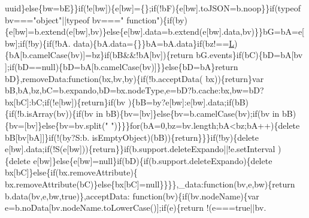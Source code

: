 \begin{DoxyCode}
      uuid\}\textcolor{keywordflow}{else}\{bw=bE\}\}\textcolor{keywordflow}{if}(!e[bw])\{e[bw]=\{\};\textcolor{keywordflow}{if}(!bF)\{e[bw].toJSON=b.noop\}\}\textcolor{keywordflow}{if}(typeof bv===\textcolor{stringliteral}{"object"}||typeof bv===\textcolor{stringliteral}{"
      function"})\{\textcolor{keywordflow}{if}(by)\{e[bw]=b.extend(e[bw],bv)\}\textcolor{keywordflow}{else}\{e[bw].data=b.extend(e[bw].data,bv)\}\}bG=bA=e[bw];\textcolor{keywordflow}{if}(!by)\{\textcolor{keywordflow}{if}(!bA.
      data)\{bA.data=\{\}\}bA=bA.data\}\textcolor{keywordflow}{if}(bz!==\hyperlink{jquery_8js_a38ee4c0b5f4fe2a18d0c783af540d253}{L})\{bA[b.camelCase(bv)]=bz\}\textcolor{keywordflow}{if}(bB&&!bA[bv])\{\textcolor{keywordflow}{return} bG.events\}\textcolor{keywordflow}{if}(bC)\{bD=bA[bv
      ];\textcolor{keywordflow}{if}(bD==null)\{bD=bA[b.camelCase(bv)]\}\}\textcolor{keywordflow}{else}\{bD=bA\}\textcolor{keywordflow}{return} bD\},removeData:\textcolor{keyword}{function}(bx,bv,by)\{\textcolor{keywordflow}{if}(!b.acceptData(
      bx))\{\textcolor{keywordflow}{return}\}var bB,bA,bz,bC=b.expando,bD=bx.nodeType,e=bD?b.cache:bx,bw=bD?bx[bC]:bC;\textcolor{keywordflow}{if}(!e[bw])\{\textcolor{keywordflow}{return}\}\textcolor{keywordflow}{if}(bv
      )\{bB=by?e[bw]:e[bw].data;\textcolor{keywordflow}{if}(bB)\{\textcolor{keywordflow}{if}(!b.isArray(bv))\{\textcolor{keywordflow}{if}(bv in bB)\{bv=[bv]\}\textcolor{keywordflow}{else}\{bv=b.camelCase(bv);\textcolor{keywordflow}{if}(bv in bB)
      \{bv=[bv]\}\textcolor{keywordflow}{else}\{bv=bv.split(\textcolor{stringliteral}{" "})\}\}\}\textcolor{keywordflow}{for}(bA=0,bz=bv.length;bA<bz;bA++)\{\textcolor{keyword}{delete} bB[bv[bA]]\}\textcolor{keywordflow}{if}(!(by?S:b.
      isEmptyObject)(bB))\{\textcolor{keywordflow}{return}\}\}\}\textcolor{keywordflow}{if}(!by)\{\textcolor{keyword}{delete} e[bw].data;\textcolor{keywordflow}{if}(!S(e[bw]))\{\textcolor{keywordflow}{return}\}\}\textcolor{keywordflow}{if}(b.support.deleteExpando||!e.setInterval
      )\{\textcolor{keyword}{delete} e[bw]\}\textcolor{keywordflow}{else}\{e[bw]=null\}\textcolor{keywordflow}{if}(bD)\{\textcolor{keywordflow}{if}(b.support.deleteExpando)\{\textcolor{keyword}{delete} bx[bC]\}\textcolor{keywordflow}{else}\{\textcolor{keywordflow}{if}(bx.removeAttribute)\{
      bx.removeAttribute(bC)\}\textcolor{keywordflow}{else}\{bx[bC]=null\}\}\}\},\_data:\textcolor{keyword}{function}(bv,e,bw)\{\textcolor{keywordflow}{return} b.data(bv,e,bw,\textcolor{keyword}{true})\},acceptData:\textcolor{keyword}{
      function}(bv)\{\textcolor{keywordflow}{if}(bv.nodeName)\{var e=b.noData[bv.nodeName.toLowerCase()];\textcolor{keywordflow}{if}(e)\{\textcolor{keywordflow}{return} !(e===\textcolor{keyword}{true}||bv.

\end{DoxyCode}
